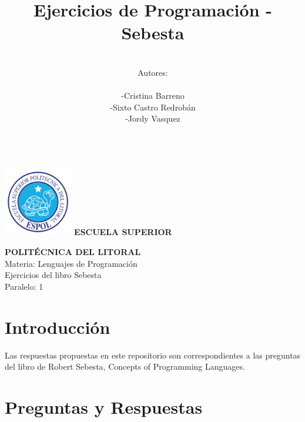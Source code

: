 \documentclass[12pt,oneside]{article}
\title{Ejercicios de Programación - Sebesta}
\author{\\Autores: \\  \\-Cristina Barreno \\ -Sixto Castro Redrobán\\ -Jordy Vasquez\\ \\}
\begin{document}
\includegraphics[width=3cm]{./imagenes/Espol.png}{ \fontsize{18}{0} \bf ESCUELA SUPERIOR \\}

\begin{center}
{\fontsize{18}{0} \bf POLITÉCNICA DEL LITORAL\\}
\vspace{2cm}
{\LARGE{ Materia: Lenguajes de Programación }}\\
\vspace{2cm}
{\LARGE{  Ejercicios del libro Sebesta}}\\ 
\vspace{2cm}
{\LARGE{ Paralelo: 1}}\\
\vspace{2cm}
\end{center}
\maketitle
\newpage
\section{Introducción}
Las respuestas propuestas en este repositorio son correspondientes a las preguntas del libro de Robert Sebesta, Concepts of Programming Languages.

\section{Preguntas y Respuestas}
\end{document}
